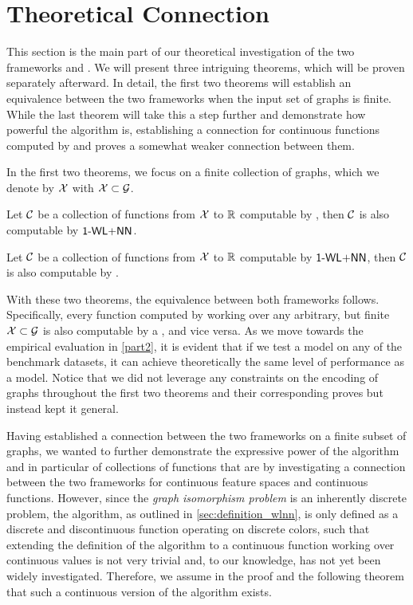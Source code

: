 \section{Theoretical Connection}\label{sec:theo_connections}
This section is the main part of our theoretical investigation of the two frameworks \wlnn and \gnn. We will present three intriguing theorems, which will be proven separately afterward. In detail, the first two theorems will establish an equivalence between the two frameworks when the input set of graphs is finite. While the last theorem will take this a step further and demonstrate how powerful the \wl algorithm is, establishing a connection for continuous functions computed by \wlnn and \gnn proves a somewhat weaker connection between them.

In the first two theorems, we focus on a finite collection of graphs, which we denote by $\mathcal{X}$ with $\mathcal{X} \subset \mathcal{G}$.
\begin{theorem}\label{theorem:1wl_in_gnn}
    Let $\mathcal{C}$ be a collection of functions from $\mathcal{X}$ to $\mathbb{R}$ computable by \gnns, then $\mathcal{C}$ is also computable by $\textsf{1-WL+NN}$.
\end{theorem}

\begin{theorem}\label{theorem:gnn_in_1wl}
    Let $\mathcal{C}$ be a collection of functions from $\mathcal{X}$ to $\mathbb{R}$ computable by $\textsf{1-WL+NN}$, then $\mathcal{C}$ is also computable by \gnns.
\end{theorem}
With these two theorems, the equivalence between both frameworks follows. Specifically, every function computed by \wlnn working over any arbitrary, but finite $\mathcal{X} \subset \mathcal{G}$ is also computable by a \gnn, and vice versa. As we move towards the empirical evaluation in \cref{part2}, it is evident that if we test a \wlnn model on any of the benchmark datasets, it can achieve theoretically the same level of performance as a \gnn model. Notice that we did not leverage any constraints on the encoding of graphs throughout the first two theorems and their corresponding proves but instead kept it general.

Having established a connection between the two frameworks on a finite subset of graphs, we wanted to further demonstrate the expressive power of the \wl algorithm and in particular of collections of functions that are \wldisc by investigating a connection between the two frameworks for continuous feature spaces and continuous functions. However, since the \textit{graph isomorphism problem} is an inherently discrete problem, the \wl algorithm, as outlined in \cref{sec:definition_wlnn}, is only defined as a discrete and discontinuous function operating on discrete colors, such that extending the definition of the \wl algorithm to a continuous function working over continuous values is not very trivial and, to our knowledge, has not yet been widely investigated. Therefore, we assume in the proof and the following theorem that such a continuous version of the \wl algorithm exists.

